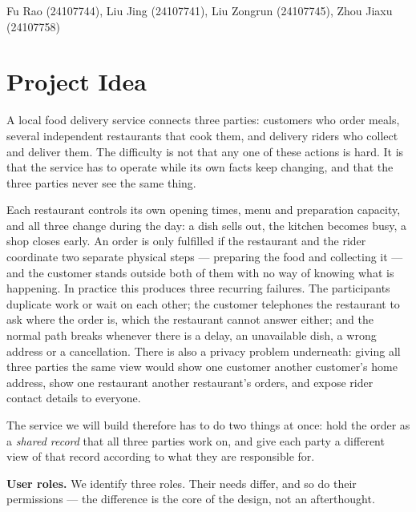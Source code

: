 


{Fu Rao (24107744), Liu Jing (24107741), Liu Zongrun (24107745), Zhou Jiaxu (24107758)}

\section{Project Idea}

A local food delivery service connects three parties: customers who order meals, several
independent restaurants that cook them, and delivery riders who collect and deliver them. The
difficulty is not that any one of these actions is hard. It is that the service has to operate
while its own facts keep changing, and that the three parties never see the same thing.

Each restaurant controls its own opening times, menu and preparation capacity, and all three
change during the day: a dish sells out, the kitchen becomes busy, a shop closes early. An order
is only fulfilled if the restaurant and the rider coordinate two separate physical steps ---
preparing the food and collecting it --- and the customer stands outside both of them with no
way of knowing what is happening. In practice this produces three recurring failures. The
participants duplicate work or wait on each other; the customer telephones the restaurant to ask
where the order is, which the restaurant cannot answer either; and the normal path breaks
whenever there is a delay, an unavailable dish, a wrong address or a cancellation. There is also
a privacy problem underneath: giving all three parties the same view would show one customer
another customer's home address, show one restaurant another restaurant's orders, and expose
rider contact details to everyone.

The service we will build therefore has to do two things at once: hold the order as a
\emph{shared record} that all three parties work on, and give each party a different view of
that record according to what they are responsible for.

\noindent\textbf{User roles.} We identify three roles. Their needs differ, and so do their
permissions --- the difference is the core of the design, not an afterthought.

